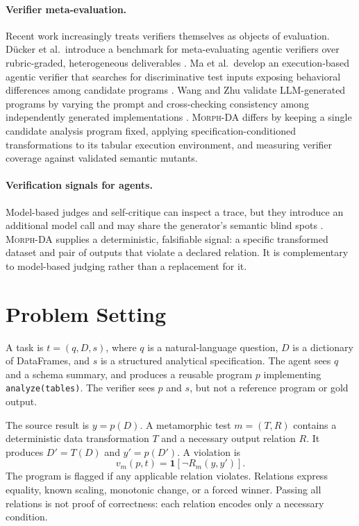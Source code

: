 \documentclass{article}
\newcommand{\morph}{\textsc{Morph-DA}\xspace}
\begin{document}
\paragraph{Verifier meta-evaluation.}
Recent work increasingly treats verifiers themselves as objects of evaluation. D{\"u}cker et al.\ introduce a benchmark for meta-evaluating agentic verifiers over rubric-graded, heterogeneous deliverables \citep{ducker2026verifying}. Ma et al.\ develop an execution-based agentic verifier that searches for discriminative test inputs exposing behavioral differences among candidate programs \citep{ma2026scaling}. Wang and Zhu validate LLM-generated programs by varying the prompt and cross-checking consistency among independently generated implementations \citep{wang2024validating}. \morph differs by keeping a single candidate analysis program fixed, applying specification-conditioned transformations to its tabular execution environment, and measuring verifier coverage against validated semantic mutants.

\paragraph{Verification signals for agents.}
Model-based judges and self-critique can inspect a trace, but they introduce an additional model call and may share the generator's semantic blind spots \citep{wang2024validating}. \morph supplies a deterministic, falsifiable signal: a specific transformed dataset and pair of outputs that violate a declared relation. It is complementary to model-based judging rather than a replacement for it.

\section{Problem Setting}
\label{sec:problem}

A task is $t=(q,D,s)$, where $q$ is a natural-language question, $D$ is a dictionary of DataFrames, and $s$ is a structured analytical specification. The agent sees $q$ and a schema summary, and produces a reusable program $p$ implementing \texttt{analyze(tables)}. The verifier sees $p$ and $s$, but not a reference program or gold output.

The source result is $y=p(D)$. A metamorphic test $m=(T,R)$ contains a deterministic data transformation $T$ and a necessary output relation $R$. It produces $D'=T(D)$ and $y'=p(D')$. A violation is
\begin{equation}
  v_m(p,t)=\mathbf{1}\!\left[\neg R_m(y,y')\right].
\end{equation}
The program is flagged if any applicable relation violates. Relations express equality, known scaling, monotonic change, or a forced winner. Passing all relations is not proof of correctness: each relation encodes only a necessary condition.
\end{document}

